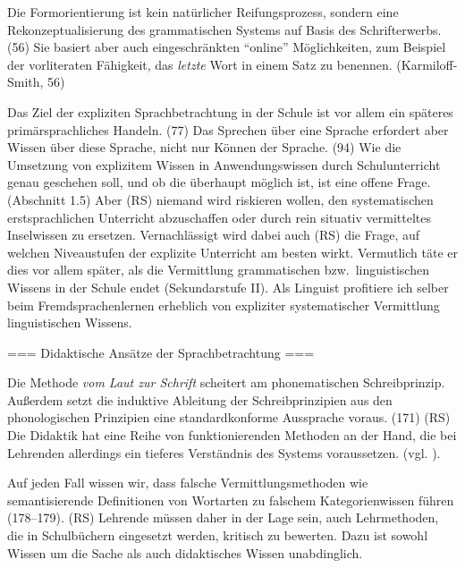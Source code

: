 Die Formorientierung ist kein natürlicher Reifungsprozess, sondern eine Rekonzeptualisierung des grammatischen Systems auf Basis des Schrifterwerbs. (56)
Sie basiert aber auch eingeschränkten "`online"' Möglichkeiten, zum Beispiel der vorliteraten Fähigkeit, das \textit{letzte} Wort in einem Satz zu benennen. (Karmiloff-Smith, 56)

Das Ziel der expliziten Sprachbetrachtung in der Schule ist vor allem ein späteres primärsprachliches Handeln. (77)
Das Sprechen über eine Sprache erfordert aber Wissen über diese Sprache, nicht nur Können der Sprache. (94)
Wie die Umsetzung von explizitem Wissen in Anwendungswissen durch Schulunterricht genau geschehen soll, und ob die überhaupt möglich ist, ist eine offene Frage. (Abschnitt 1.5) Aber (RS) niemand wird riskieren wollen, den systematischen erstsprachlichen Unterricht abzuschaffen oder durch rein situativ vermitteltes Inselwissen zu ersetzen. Vernachlässigt wird dabei auch (RS) die Frage, auf welchen Niveaustufen der explizite Unterricht am besten wirkt. Vermutlich täte er dies vor allem später, als die Vermittlung grammatischen bzw.\ linguistischen Wissens in der Schule endet (Sekundarstufe II). Als Linguist profitiere ich selber \zB beim Fremdsprachenlernen erheblich von expliziter systematischer Vermittlung linguistischen Wissens.

=== Didaktische Ansätze der Sprachbetrachtung ===

Die Methode \textit{vom Laut zur Schrift} scheitert am phonematischen Schreibprinzip.
Außerdem setzt die induktive Ableitung der Schreibprinzipien aus den phonologischen Prinzipien eine standardkonforme Aussprache voraus. (171)
(RS) Die Didaktik hat eine Reihe von funktionierenden Methoden an der Hand, die bei Lehrenden allerdings ein tieferes Verständnis des Systems voraussetzen. (vgl. \citealt[Abschnit~2.1]{Bredel2013}).

Auf jeden Fall wissen wir, dass falsche Vermittlungsmethoden wie semantisierende Definitionen von Wortarten zu falschem Kategorienwissen führen (178--179). (RS) Lehrende müssen daher in der Lage sein, auch Lehrmethoden, die in Schulbüchern eingesetzt werden, kritisch zu bewerten. Dazu ist sowohl Wissen um die Sache als auch didaktisches Wissen unabdinglich.


